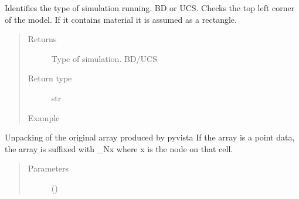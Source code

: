 \documentclass[letterpaper,10pt,english]{sphinxmanual}
\begin{document}
\begin{fulllineitems}
\begin{fulllineitems}
\end{fulllineitems}


\begin{fulllineitems}
\label{\detokenize{openfdem:openfdem.openfdem.Model.simulation_type}}
Identifies the type of simulation running. BD or UCS.
Checks the top left corner of the model. If it contains material it is assumed as a rectangle.
\begin{quote}\begin{description}
\item[{Returns}] \leavevmode
Type of simulation. BD/UCS

\item[{Return type}] \leavevmode
str

\item[{Example}] \leavevmode
\begin{sphinxVerbatim}[commandchars=\\\{\}]
   
  
\end{sphinxVerbatim}

\end{description}\end{quote}

\end{fulllineitems}


\begin{fulllineitems}
\label{\detokenize{openfdem:openfdem.openfdem.Model.unpack_DataFrame}}
Unpacking of the original array produced by pyvista
If the array is a point data, the array is suffixed with \_Nx where x is the node on that cell.
\begin{quote}\begin{description}
\item[{Parameters}] \leavevmode
{} () \textendash{} 


\end{description}
\end{quote}
\end{fulllineitems}
\end{fulllineitems}
\end{document}
